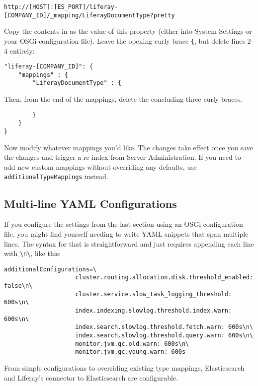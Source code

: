 \begin{verbatim}
http://[HOST]:[ES_PORT]/liferay-[COMPANY_ID]/_mapping/LiferayDocumentType?pretty
\end{verbatim}

Copy the contents in as the value of this property (either into System
Settings or your OSGi configuration file). Leave the opening curly brace
\texttt{\{}, but delete lines 2-4 entirely:

\begin{verbatim}
"liferay-[COMPANY_ID]": {
    "mappings" : {
        "LiferayDocumentType" : {
\end{verbatim}

Then, from the end of the mappings, delete the concluding three curly
braces.

\begin{verbatim}
        }
    }
}
\end{verbatim}

Now modify whatever mappings you'd like. The changes take effect once
you save the changes and trigger a re-index from Server Administration.
If you need to add new custom mappings without overriding any defaults,
use \texttt{additionalTypeMappings} instead.

\subsection{Multi-line YAML
Configurations}\label{multi-line-yaml-configurations-1}

If you configure the settings from the last section using an OSGi
configuration file, you might find yourself needing to write YAML
snippets that span multiple lines. The syntax for that is
straightforward and just requires appending each line with
\texttt{\textbackslash{}n\textbackslash{}}, like this:

\begin{verbatim}
additionalConfigurations=\
                    cluster.routing.allocation.disk.threshold_enabled: false\n\
                    cluster.service.slow_task_logging_threshold: 600s\n\
                    index.indexing.slowlog.threshold.index.warn: 600s\n\
                    index.search.slowlog.threshold.fetch.warn: 600s\n\
                    index.search.slowlog.threshold.query.warn: 600s\n\
                    monitor.jvm.gc.old.warn: 600s\n\
                    monitor.jvm.gc.young.warn: 600s
\end{verbatim}

From simple configurations to overriding existing type mappings,
Elasticsearch and Liferay's connector to Elasticsearch are configurable.

